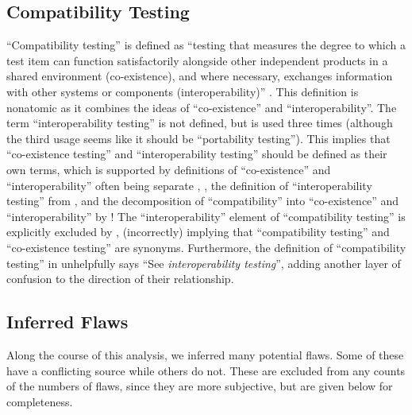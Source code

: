 \subsection{Compatibility Testing}
\label{compat-flaw}

``Compatibility testing'' is defined as ``testing that measures the
degree to which a test item can function satisfactorily alongside
other independent products in a shared environment (co-existence),
and where necessary, exchanges information with other systems or
components (interoperability)'' \citep[p.~3]{IEEE2022}. This
definition is nonatomic as it combines the ideas of ``co-existence''
and ``interoperability''. The term ``interoperability testing'' is
not defined, but is used three times \citep[pp.~22,~43]{IEEE2022}
(although the third usage seems like it should be ``portability
testing''). This implies that ``co-existence testing'' and
``interoperability testing'' should be defined as their own terms,
which is supported by definitions of ``co-existence'' and
``interoperability'' often being separate \ifnotpaper
    \citetext{\citealpISTQB{}; \citealp[pp.~73,~237]{IEEE2017}}%
\else
    \cite[pp.~73,~237]{IEEE2017}, \cite{ISTQB}%
\fi, the definition of
``interoperability testing'' from \citet[p.~238]{IEEE2017},
and the decomposition of ``compatibility'' into ``co-existence''
and ``interoperability'' by \citet{ISO_IEC2023a}!
The ``interoperability'' element of ``compatibility testing'' is explicitly
excluded by \citet[p.~37]{IEEE2021}, (incorrectly) implying that ``compatibility
testing'' and ``co-existence testing'' are synonyms.
Furthermore, the definition of ``compatibility testing'' in
\citep[p.~43]{Kam2008} unhelpfully says ``See \emph{interoperability testing}'',
adding another layer of confusion to the direction of their relationship.

\ifnotpaper
    \subsection{Inferred Flaws}
    \label{infer-flaws}
    Along the course of this analysis, we inferred many potential flaws.
    Some of these have a conflicting source while others do not. These are
    excluded from any counts of the numbers of flaws, since they are
    more subjective, but are given below for completeness.

